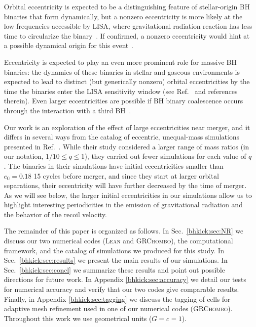 Orbital eccentricity is expected to be a distinguishing feature of
stellar-origin BH binaries that form dynamically, but a nonzero
eccentricity is more likely at the low frequencies accessible by LISA,
where gravitational radiation reaction has less time to circularize
the binary~\cite{Nishizawa:2016jji,Breivik:2016ddj,Nishizawa:2016eza}.
If confirmed, a nonzero eccentricity would hint at a possible
dynamical origin for this event~\cite{Romero-Shaw:2020thy}.

Eccentricity is expected to play an even more prominent role for
massive BH binaries: the dynamics of these binaries in stellar and
gaseous environments is expected to lead to distinct (but generically
nonzero) orbital eccentricities by the time the binaries enter the
LISA sensitivity window (see Ref.~\cite{Roedig:2011rn} and references
therein). Even larger eccentricities are possible if BH binary
coalescence occurs through the interaction with a third
BH~\cite{Bonetti:2018tpf}.

Our work is an exploration of the effect of large eccentricities near
merger, and it differs in several ways from the catalog of eccentric,
unequal-mass simulations presented in Ref.~\cite{Huerta:2019oxn}.
While their study considered a larger range of mass ratios (in our
notation, $1/10\leq q\leq 1$), they carried out fewer simulations for
each value of $q$. The binaries in their simulations have initial
eccentricities smaller than $e_0 = 0.18$ 15 cycles before merger,
and since they start at larger orbital separations,
their eccentricity will have further decreased by the time of merger.
As we will see below, the larger initial eccentricities in
our simulations allow us to highlight interesting periodicities in the
emission of gravitational radiation and the behavior of the recoil
velocity.

The remainder of this paper is organized as follows.
%
In Sec.~\ref{bhkick:sec:NR} we discuss our two numerical codes (\textsc{Lean}
and \textsc{GRChombo}), the computational framework, and the catalog
of simulations we produced for this study. In Sec.~\ref{bhkick:sec:results}
we present the main results of our simulations. In
Sec.~\ref{bhkick:sec:concl} we summarize these results and point out possible
directions for future work. In Appendix \ref{bhkick:sec:accuracy} we
detail our tests for numerical accuracy and verify that
our two codes give comparable results.
Finally, in Appendix \ref{bhkick:sec:tagging} we 
discuss the tagging of cells for adaptive mesh refinement used in one
of our numerical codes (\textsc{GRChombo}).
%
Throughout this work we use geometrical units ($G=c=1$).

